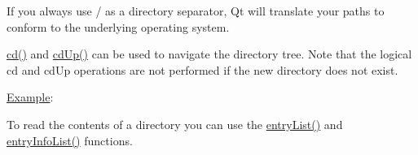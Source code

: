 If you always use \textquotesingle{}/\textquotesingle{} as a directory separator, Qt will translate your paths to conform to the underlying operating system.

\mbox{\hyperlink{class_q_dir_a5a58d7a5387627fa479f2ac376895e6a}{cd()}} and \mbox{\hyperlink{class_q_dir_a22a212babdfa332de6ee9d07f96dc2ba}{cd\+Up()}} can be used to navigate the directory tree. Note that the logical cd and cd\+Up operations are not performed if the new directory does not exist.

\mbox{\hyperlink{struct_example}{Example}}\+: 
\begin{DoxyCode}{0}
\DoxyCodeLine{\} \textcolor{keywordflow}{else} \{}
\DoxyCodeLine{\}}
\end{DoxyCode}


To read the contents of a directory you can use the \mbox{\hyperlink{class_q_dir_ab5e2b4ce772dc4b8941425cf780df9ab}{entry\+List()}} and \mbox{\hyperlink{class_q_dir_ada9ea9da108cbebd0ac88231f39fced0}{entry\+Info\+List()}} functions.

